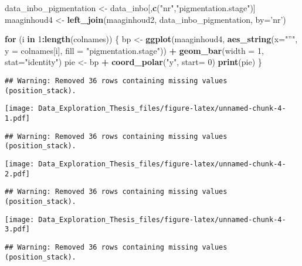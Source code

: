 \documentclass[]{article}
\newenvironment{Shaded}{\begin{snugshade}}{\end{snugshade}}
\newcommand{\KeywordTok}[1]{\textcolor[rgb]{0.13,0.29,0.53}{\textbf{#1}}}
\newcommand{\DataTypeTok}[1]{\textcolor[rgb]{0.13,0.29,0.53}{#1}}
\newcommand{\DecValTok}[1]{\textcolor[rgb]{0.00,0.00,0.81}{#1}}
\newcommand{\StringTok}[1]{\textcolor[rgb]{0.31,0.60,0.02}{#1}}
\newcommand{\ControlFlowTok}[1]{\textcolor[rgb]{0.13,0.29,0.53}{\textbf{#1}}}
\newcommand{\OperatorTok}[1]{\textcolor[rgb]{0.81,0.36,0.00}{\textbf{#1}}}
\newcommand{\NormalTok}[1]{#1}
\begin{document}
\begin{Shaded}
\begin{Highlighting}[]
\NormalTok{data_inbo_pigmentation <-}\StringTok{ }\NormalTok{data_inbo[,}\KeywordTok{c}\NormalTok{(}\StringTok{"nr"}\NormalTok{,}\StringTok{"pigmentation.stage"}\NormalTok{)]}
\NormalTok{maaginhoud4 <-}\StringTok{ }\KeywordTok{left_join}\NormalTok{(maaginhoud2, data_inbo_pigmentation, }\DataTypeTok{by=}\StringTok{'nr'}\NormalTok{)}

\ControlFlowTok{for}\NormalTok{ (i }\ControlFlowTok{in} \DecValTok{1}\OperatorTok{:}\KeywordTok{length}\NormalTok{(colnames)) \{}
\NormalTok{  bp <-}\StringTok{ }\KeywordTok{ggplot}\NormalTok{(maaginhoud4, }\KeywordTok{aes_string}\NormalTok{(}\DataTypeTok{x=}\StringTok{"''"}\NormalTok{, }\DataTypeTok{y =}\NormalTok{ colnames[i], }\DataTypeTok{fill =} \StringTok{"pigmentation.stage"}\NormalTok{)) }\OperatorTok{+}
\StringTok{    }\KeywordTok{geom_bar}\NormalTok{(}\DataTypeTok{width =} \DecValTok{1}\NormalTok{, }\DataTypeTok{stat=}\StringTok{"identity"}\NormalTok{)}
\NormalTok{  pie <-}\StringTok{ }\NormalTok{bp }\OperatorTok{+}\StringTok{ }\KeywordTok{coord_polar}\NormalTok{(}\StringTok{"y"}\NormalTok{, }\DataTypeTok{start=} \DecValTok{0}\NormalTok{)}
  \KeywordTok{print}\NormalTok{(pie)}
\NormalTok{\}}
\end{Highlighting}
\end{Shaded}

\begin{verbatim}
## Warning: Removed 36 rows containing missing values (position_stack).
\end{verbatim}

\texttt{[image: Data\_Exploration\_Thesis\_files/figure-latex/unnamed-chunk-4-1.pdf]}

\begin{verbatim}
## Warning: Removed 36 rows containing missing values (position_stack).
\end{verbatim}

\texttt{[image: Data\_Exploration\_Thesis\_files/figure-latex/unnamed-chunk-4-2.pdf]}

\begin{verbatim}
## Warning: Removed 36 rows containing missing values (position_stack).
\end{verbatim}

\texttt{[image: Data\_Exploration\_Thesis\_files/figure-latex/unnamed-chunk-4-3.pdf]}

\begin{verbatim}
## Warning: Removed 36 rows containing missing values (position_stack).
\end{verbatim}
\end{document}
